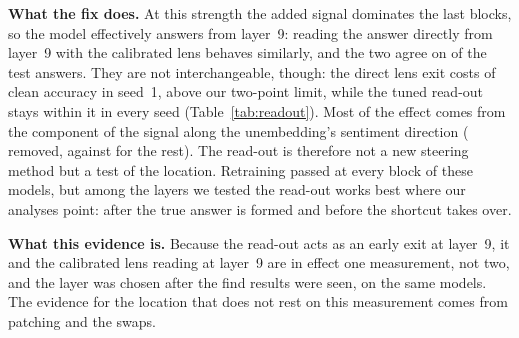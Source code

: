 \textbf{What the fix does.} At this strength the added signal dominates the last blocks, so the model effectively
answers from layer~9: reading the answer directly from layer~9 with the calibrated lens behaves similarly, and the two
agree on \phAgreementFullFTRange{} of the test answers. They are not interchangeable, though: the direct lens exit
costs \phLensDropFullFTsOne{} of clean accuracy in seed~1, above our two-point limit, while the tuned read-out stays
within it in every seed (Table~\ref{tab:readout}). Most of the effect comes
from the component of the signal along the unembedding's sentiment direction (\pSixBParRemovedFullFTRange{} removed,
against \pSixBPerpRemovedFullFTRange{} for the rest). The read-out is therefore not a new steering method but a test of
the location. Retraining passed at every block of these models, but among the layers we tested the read-out works best
where our analyses point: after the true answer is formed and before the shortcut takes over.

\textbf{What this evidence is.} Because the read-out acts as an early exit at layer~9, it and the calibrated lens
reading at layer~9 are in effect one measurement, not two, and the layer was chosen after the find results were seen,
on the same models. The evidence for the location that does not rest on this measurement comes from patching and the
swaps.
